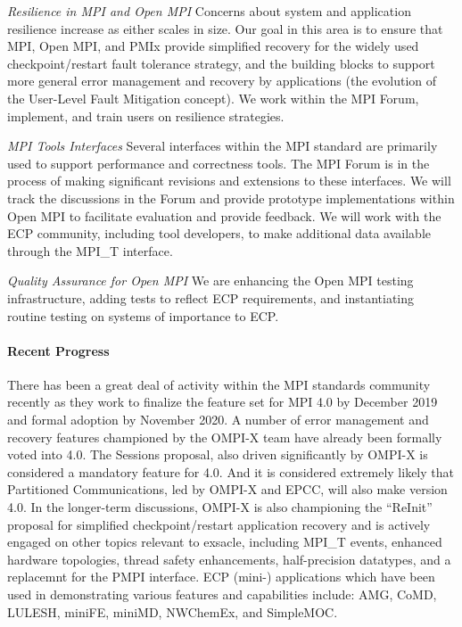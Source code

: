 \emph{Resilience in MPI and Open MPI} Concerns about system and
application resilience increase as either scales in size.  Our goal in
this area is to ensure that MPI, Open MPI, and PMIx provide simplified 
recovery for the widely used checkpoint/restart fault tolerance strategy, and the building
blocks to support more general error management and recovery by applications (the evolution of the User-Level
Fault Mitigation concept). We work within the MPI Forum, implement,
and train users on resilience strategies.

\emph{MPI Tools Interfaces}  Several interfaces within the
MPI standard are primarily used to support performance and
correctness tools.
The MPI Forum is in the process
of making significant revisions and extensions to these interfaces.
We will track the discussions in the Forum and provide prototype
implementations within Open MPI to facilitate evaluation and provide
feedback.
We will work with the
ECP community, including tool developers, to make additional data
available through the MPI\_T interface.

\emph{Quality Assurance for Open MPI}  We are enhancing the
Open MPI testing infrastructure, adding tests to reflect ECP
requirements, and instantiating routine testing on systems of
importance to ECP.

\paragraph{Recent Progress}
There has been a great deal of activity within the MPI standards community recently
as they work to finalize the feature set for MPI 4.0 by December 2019 and
formal adoption by November 2020.  A number of error management and recovery features
championed by the OMPI-X team have already been formally voted into 4.0.  The Sessions proposal,
also driven significantly by OMPI-X is considered a mandatory feature for 4.0.  And it is considered extremely likely that Partitioned Communications, led by OMPI-X and EPCC, will also make version 4.0.
In the longer-term discussions, OMPI-X is also championing the ``ReInit'' proposal for simplified checkpoint/restart application recovery and is actively engaged on other topics relevant to
exsacle, including MPI\_T events, enhanced hardware topologies, thread safety enhancements, half-precision datatypes, and a replacemnt for the PMPI interface.  ECP (mini-) applications which have been used in demonstrating various features and capabilities include: AMG, CoMD, LULESH, miniFE, miniMD, NWChemEx, and SimpleMOC.

